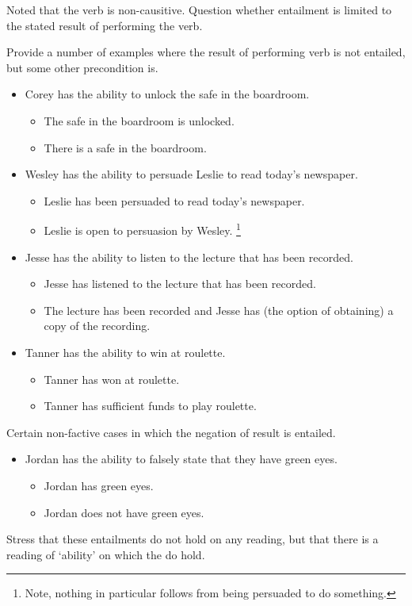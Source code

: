 \begin{note}[Contrast]
  Noted that the verb is non-causitive.
  Question whether entailment is limited to the stated result of performing the verb.

  Provide a number of examples where the result of performing verb is not entailed, but some other precondition is.
  \begin{itemize}
  \item Corey has the ability to unlock the safe in the boardroom.
    \begin{itemize}
    \item[\(\nleadsto\)] The safe in the boardroom is unlocked.
    \item[\(\leadsto\)] There is a safe in the boardroom.
    \end{itemize}
  \item Wesley has the ability to persuade Leslie to read today's newspaper.
    \begin{itemize}
    \item[\(\nleadsto\)] Leslie has been persuaded to read today's newspaper.
    \item[\(\leadsto\)] Leslie is open to persuasion by Wesley.\nolinebreak
      \footnote{Note, nothing in particular follows from being persuaded to do something.}
    \end{itemize}
  \item Jesse has the ability to listen to the lecture that has been recorded.
    \begin{itemize}
    \item[\(\nleadsto\)] Jesse has listened to the lecture that has been recorded.
    \item[\(\leadsto\)] The lecture has been recorded and Jesse has (the option of obtaining) a copy of the recording.
    \end{itemize}
  \item Tanner has the ability to win at roulette.
    \begin{itemize}
    \item[\(\nleadsto\)] Tanner has won at roulette.
    \item[\(\leadsto\)] Tanner has sufficient funds to play roulette.
    \end{itemize}
  \end{itemize}

  Certain non-factive cases in which the negation of result is entailed.
  \begin{itemize}
  \item Jordan has the ability to falsely state that they have green eyes.
    \begin{itemize}
    \item[\(\nleadsto\)] Jordan has green eyes.
    \item[\(\leadsto\)] Jordan does not have green eyes.
    \end{itemize}
  \end{itemize}

  Stress that these entailments do not hold on any reading, but that there is a reading of `ability' on which the do hold.
\end{note}

